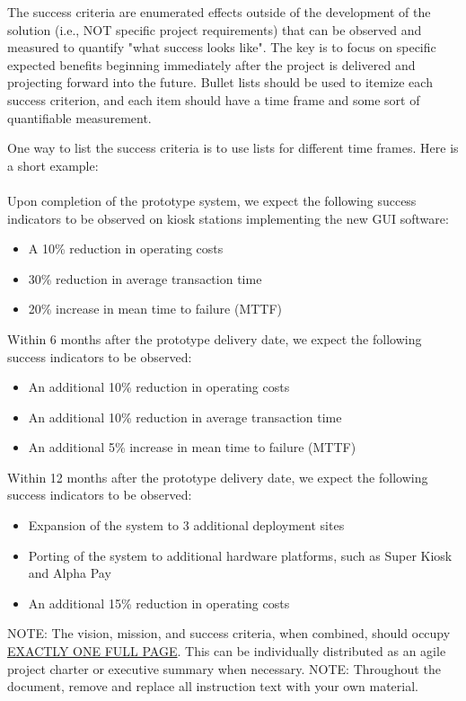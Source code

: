 The success criteria are enumerated effects outside of the development of the solution (i.e., NOT specific project requirements) that can be observed and measured to quantify "what success looks like". The key is to focus on specific expected benefits beginning immediately after the project is delivered and projecting forward into the future. Bullet lists should be used to itemize each success criterion, and each item should have a time frame and some sort of quantifiable measurement.

One way to list the success criteria is to use lists for different time frames. Here is a short example:
\\
\\
Upon completion of the prototype system, we expect the following success indicators to be observed on kiosk stations implementing the new GUI software:
\begin{itemize}
  \item A 10\% reduction in operating costs
  \item 30\% reduction in average transaction time
  \item 20\% increase in mean time to failure (MTTF)
\end{itemize}

Within 6 months after the prototype delivery date, we expect the following success indicators to be observed:
\begin{itemize}
  \item An additional 10\% reduction in operating costs
  \item An additional 10\% reduction in average transaction time
  \item An additional 5\% increase in mean time to failure (MTTF)
\end{itemize}

Within 12 months after the prototype delivery date, we expect the following success indicators to be observed:
\begin{itemize}
  \item Expansion of the system to 3 additional deployment sites
  \item Porting of the system to additional hardware platforms, such as Super Kiosk and Alpha Pay
  \item An additional 15\% reduction in operating costs
\end{itemize}

NOTE: The vision, mission, and success criteria, when combined, should occupy \underline{EXACTLY ONE FULL PAGE}. This can be individually distributed as an agile project charter or executive summary when necessary.
NOTE: Throughout the document, remove and replace all instruction text with your own material. 
